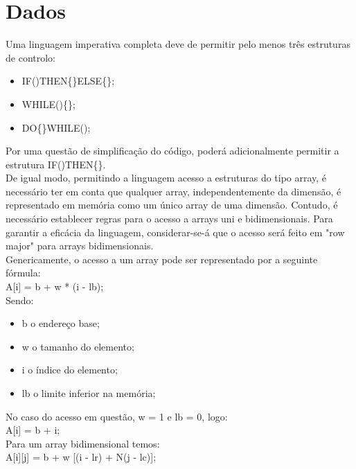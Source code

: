 \section{Dados}
\label{sec:dados:analise}

Uma linguagem imperativa completa deve de permitir pelo menos três estruturas de controlo:

\begin{itemize}
\item IF()THEN\{\}ELSE\{\};
\item WHILE()\{\};
\item DO\{\}WHILE();
\end{itemize}

Por uma questão de simplificação do código, poderá adicionalmente permitir a estrutura IF()THEN\{\}.\\

De igual modo, permitindo a linguagem acesso a estruturas do tipo array, é necessário ter em conta que qualquer array, independentemente da dimensão, é representado em memória como um único array de uma dimensão. Contudo, é necessário establecer regras para o acesso a arrays uni e bidimensionais. Para garantir a eficácia da linguagem, considerar-se-á que o acesso será feito em "row major" para arrays bidimensionais.\\

Genericamente, o acesso a um array pode ser representado por a seguinte fórmula:\\

A[i] = b + w * (i - lb);\\

Sendo:

\begin{itemize}
\item b o endereço base;
\item w o tamanho do elemento;
\item i o índice do elemento;
\item lb o limite inferior na memória;
\end{itemize}

No caso do acesso em questão, w = 1 e lb = 0, logo:\\

A[i] = b + i;\\


Para um array bidimensional temos:\\

A[i][j] = b + w [(i - lr) + N(j - lc)];\\

